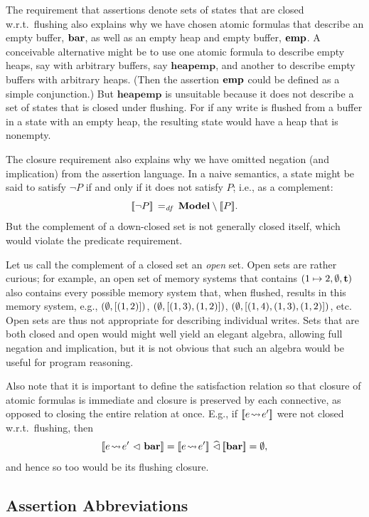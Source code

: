\documentclass[11pt]{report}
\begin{document}
The requirement that assertions denote sets of states that are closed w.r.t.~flushing also explains why we have chosen atomic formulas that describe an empty buffer, $\mathbf{bar}$, as well as an empty heap and empty buffer, $\mathbf{emp}$. A conceivable alternative might be to use one atomic formula to describe empty heaps, say with arbitrary buffers, say $\mathbf{heapemp}$, and another to describe empty buffers with arbitrary heaps. (Then the assertion $\mathbf{emp}$ could be defined as a simple conjunction.) But $\mathbf{heapemp}$ is unsuitable because it does not describe a set of states that is closed under flushing. For if any write is flushed from a buffer in a state with an empty heap, the resulting state would have a heap that is nonempty. 

The closure requirement also explains why we have omitted negation (and implication) from the assertion language. In a naive semantics, a state might be said to satisfy $\neg P$ if and only if it does not satisfy $P$; i.e., as a complement: \[ [\![\neg P]\!] \operatorname{\;=_{\mathit{df}}\;} \mathbf{Model} \setminus [\![P]\!]. \] But the complement of a down-closed set is not generally closed itself, which would violate the predicate requirement. 

Let us call the complement of a closed set an \emph{open} set. Open sets are rather curious; for example, an open set of memory systems that contains $(1 \mapsto 2,\operatorname{\emptyset},\mathbf{t})$ also contains every possible memory system that, when flushed, results in this memory system, e.g., $(\operatorname{\emptyset}, \left[(1,2)\right])$, $(\operatorname{\emptyset}, \left[(1,3),(1,2)\right])$, $(\operatorname{\emptyset}, \left[(1,4),(1,3),(1,2)\right])$, etc. Open sets are thus not appropriate for describing individual writes. Sets that are both closed and open would might well yield an elegant algebra, allowing full negation and implication, but it is not obvious that such an algebra would be useful for program reasoning. 

Also note that it is important to define the satisfaction relation so that closure of atomic formulas is immediate and closure is preserved by each connective, as opposed to closing the entire relation at once. E.g., if $[\![e \!\leadsto\! e']\!]$ were not closed w.r.t.~flushing, then \[\pred{e \fwriteu e' \fseq \fbaru} = \pred{e \fwriteu e'} \mseq \pred{\fbaru} = \nil,\] and hence so too would be its flushing closure.  

\subsection{Assertion Abbreviations}
\label{sec:uniprocessor-abbreviations} 
\end{document}
